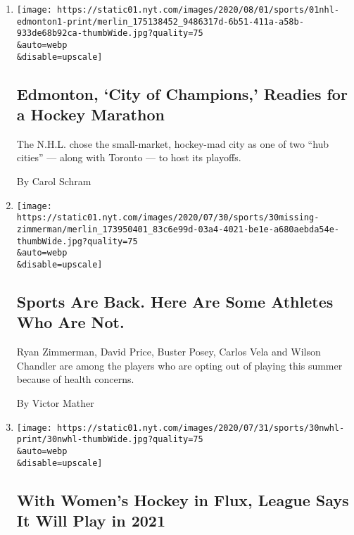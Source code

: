 \begin{enumerate}
\def\labelenumi{\arabic{enumi}.}
\item
  \href{/2020/08/01/sports/hockey/edmonton-nhl-playoffs.html}{}

  \texttt{[image: https://static01.nyt.com/images/2020/08/01/sports/01nhl-edmonton1-print/merlin\_175138452\_9486317d-6b51-411a-a58b-933de68b92ca-thumbWide.jpg?quality=75\\\&auto=webp\\\&disable=upscale]}

  \hypertarget{edmonton-city-of-champions-readies-for-a-hockey-marathon}{%
  \subsection{Edmonton, `City of Champions,' Readies for a Hockey
  Marathon}\label{edmonton-city-of-champions-readies-for-a-hockey-marathon}}

  The N.H.L. chose the small-market, hockey-mad city as one of two ``hub
  cities'' --- along with Toronto --- to host its playoffs.

  By Carol Schram
\item
  \href{/2020/07/30/sports/players-opt-out.html}{}

  \texttt{[image: https://static01.nyt.com/images/2020/07/30/sports/30missing-zimmerman/merlin\_173950401\_83c6e99d-03a4-4021-be1e-a680aebda54e-thumbWide.jpg?quality=75\\\&auto=webp\\\&disable=upscale]}

  \hypertarget{sports-are-back-here-are-some-athletes-who-are-not}{%
  \subsection{Sports Are Back. Here Are Some Athletes Who Are
  Not.}\label{sports-are-back-here-are-some-athletes-who-are-not}}

  Ryan Zimmerman, David Price, Buster Posey, Carlos Vela and Wilson
  Chandler are among the players who are opting out of playing this
  summer because of health concerns.

  By Victor Mather
\item
  \href{/2020/07/30/sports/hockey/nwhl-postpone-season.html}{}

  \texttt{[image: https://static01.nyt.com/images/2020/07/31/sports/30nwhl-print/30nwhl-thumbWide.jpg?quality=75\\\&auto=webp\\\&disable=upscale]}

  \hypertarget{with-womens-hockey-in-flux-league-says-it-will-play-in-2021}{%
  \subsection{With Women's Hockey in Flux, League Says It Will Play in
  2021}\label{with-womens-hockey-in-flux-league-says-it-will-play-in-2021}}


\end{enumerate}
